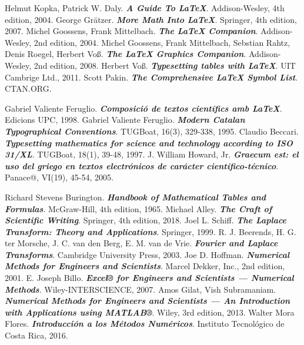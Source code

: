 \begin{thebibliography}{99}


     Helmut Kopka, Patrick W. Daly. \textbf{\textit{A Guide To \LaTeX}}.  Addison-Wesley, 4th edition, 2004.
     George Grätzer. \textbf{\textit{More Math Into \LaTeX}}.  Springer, 4th edition, 2007.
     Michel Goossens, Frank Mittelbach. \textbf{\textit{The \LaTeX{} Companion}}.  Addison-Wesley, 2nd edition, 2004.
     Michel Goossens, Frank Mittelbach, Sebstian Rahtz, Denis Roegel, Herbert Voß. \textbf{\textit{The \LaTeX{} Graphics Companion}}.  Addison-Wesley, 2nd edition, 2008.
     Herbert Voß. \textbf{\textit{Typesetting tables with \LaTeX{}}}.  UIT Cambrige Ltd., 2011.
     Scott Pakin. \textbf{\textit{The Comprehensive \LaTeX{} Symbol List}}. CTAN.ORG.

     Gabriel Valiente Feruglio. \textbf{\textit{Composició de textos científics amb \LaTeX}}.  Edicions UPC, 1998.
     Gabriel Valiente Feruglio. \textbf{\textit{Modern Catalan Typographical Conventions}}.  TUGBoat, 16(3), 329-338, 1995.
     Claudio Beccari. \textbf{\textit{Typesetting mathematics for science and technology according to ISO 31/XL}}.  TUGBoat, 18(1), 39-48, 1997.
     J. William Howard, Jr. \textbf{\textit{Graecum est: el uso del griego en textos electrónicos de carácter científico-técnico}}.  Panace@, VI(19), 45-54, 2005.

     Richard Stevens Burington. \textbf{\textit{Handbook of Mathematical Tables and Formulas}}.  McGraw-Hill, 4th edition, 1965.
     Michael Alley. \textbf{\textit{The Craft of Scientific Writing}}. Springer, 4th edition, 2018.
     Joel L. Schiff. \textbf{\textit{The Laplace Transform: Theory and Applications}}.  Springer, 1999.
     R. J. Beerends, H. G. ter Morsche, J. C. van den Berg, E. M. van de Vrie. \textbf{\textit{Fourier and Laplace Transforms}}.  Cambridge University Press, 2003.
     Joe D. Hoffman. \textbf{\textit{Numerical Methods for Engineers and Scientists}}.  Marcel Dekker, Inc., 2nd edition, 2001.
     E. Joseph Billo. \textbf{\textit{Excel® for Engineers and Scientists --- Numerical Methods}}.  Wiley-INTERSCIENCE, 2007.
     Amos Gilat, Vish Subramaniam. \textbf{\textit{Numerical Methods for Engineers and Scientists ---
        An Introduction with Applications using MATLAB®}}.  Wiley, 3rd edition, 2013.
     Walter Mora Flores. \textbf{\textit{Introducción a los Métodos Numéricos}}.  Instituto Tecnológico de Costa Rica, 2016.


\end{thebibliography}
